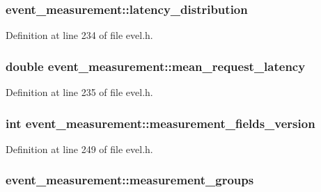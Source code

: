 \subsubsection[{latency\+\_\+distribution}]{ event\+\_\+measurement\+::latency\+\_\+distribution}\label{structevent__measurement_a6196660aa48b40e8a571b7d15152c519}


Definition at line 234 of file evel.\+h.

\hypertarget{structevent__measurement_a44f155239afb1b7a2cfeceef685a144d}{}
\subsubsection[{mean\+\_\+request\+\_\+latency}]{\setlength{\rightskip}{0pt plus 5cm}double event\+\_\+measurement\+::mean\+\_\+request\+\_\+latency}\label{structevent__measurement_a44f155239afb1b7a2cfeceef685a144d}


Definition at line 235 of file evel.\+h.

\hypertarget{structevent__measurement_a07a49b5189c9a8c8e81989a5288ad4f6}{}
\subsubsection[{measurement\+\_\+fields\+\_\+version}]{\setlength{\rightskip}{0pt plus 5cm}int event\+\_\+measurement\+::measurement\+\_\+fields\+\_\+version}\label{structevent__measurement_a07a49b5189c9a8c8e81989a5288ad4f6}


Definition at line 249 of file evel.\+h.

\hypertarget{structevent__measurement_a1d2ba76652e34cc7e4598187d55d72f7}{}
\subsubsection[{measurement\+\_\+groups}]{ event\+\_\+measurement\+::measurement\+\_\+groups}\label{structevent__measurement_a1d2ba76652e34cc7e4598187d55d72f7}


